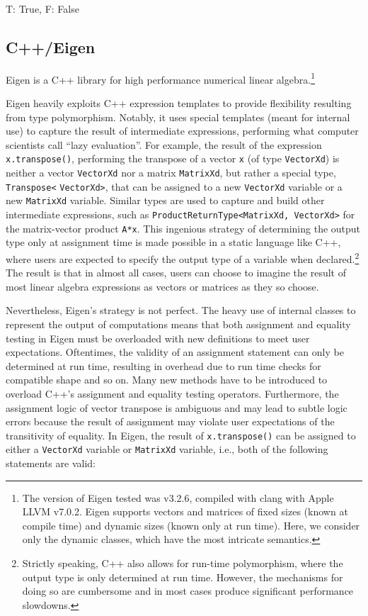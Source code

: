 T: True, F: False



\subsection{C++/Eigen}

Eigen is a C++ library for high performance numerical linear
algebra.\cite{eigenweb}\footnote{The version of Eigen tested was v3.2.6,
compiled with clang with Apple LLVM v7.0.2. Eigen supports vectors and
matrices of fixed sizes (known at compile time) and dynamic sizes (known only
at run time). Here, we consider only the dynamic classes, which have
the most intricate semantics.
}

Eigen heavily exploits C++ expression templates to provide flexibility
resulting from type polymorphism. Notably, it uses special templates (meant for
internal use) to capture the result of intermediate expressions, performing
what computer scientists call ``lazy evaluation''. For example, the result of
the expression \verb`x.transpose()`, performing the transpose of a vector
\verb`x` (of type \verb`VectorXd`) is neither a vector \verb`VectorXd` nor a
matrix \verb`MatrixXd`, but rather a special type, \verb`Transpose<`
\verb`VectorXd>`, that can be assigned to a new \verb`VectorXd` variable or a
new \verb`MatrixXd` variable. Similar types are used to capture and build other
intermediate expressions, such as \verb`ProductReturnType<MatrixXd, VectorXd>`
for the matrix-vector product \verb`A*x`.  This ingenious strategy of
determining the output type only at assignment time is made possible in a
static language like C++, where users are expected to specify the output type
of a variable when declared.\footnote{Strictly speaking, C++ also allows for
run-time polymorphism, where the output type is only determined at run time.
However, the mechanisms for doing so are cumbersome and in most cases produce
significant performance slowdowns.} The result is that in almost all cases,
users can choose to imagine the result of most linear algebra expressions as
vectors or matrices as they so choose.

Nevertheless, Eigen's strategy is not perfect. The heavy use of internal
classes to represent the output of computations means that both assignment and
equality testing in Eigen must be overloaded with new definitions to meet user
expectations. Oftentimes, the validity of an assignment statement can only be
determined at run time, resulting in overhead due to run time checks for
compatible shape and so on. Many new methods have to be introduced to overload
C++'s assignment and equality testing operators. Furthermore, the assignment
logic of vector transpose is ambiguous and may lead to subtle logic errors
because the result of assignment may violate user expectations of the
transitivity of equality. In Eigen, the result of \verb`x.transpose()` can be
assigned to either a \verb`VectorXd` variable or \verb`MatrixXd` variable,
i.e., both of the following statements are valid:

